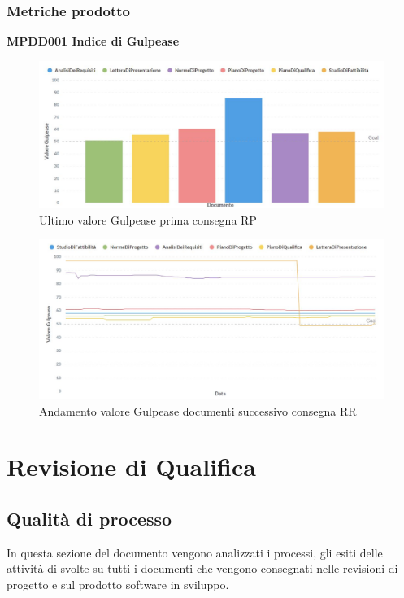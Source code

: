 \documentclass[PianoDiQualifica.tex]{subfiles}
\begin{document}
\subsubsection{Metriche prodotto}
\textbf{MPDD001 Indice di Gulpease}
\begin{figure}[htbp]
	\centering
	\includegraphics[width=1\linewidth]{RP/gulpease}
	\caption{Ultimo valore Gulpease prima consegna RP}
	\label{fig:processi}
\end{figure}
\begin{figure}[htbp]
	\centering
	\includegraphics[width=1\linewidth]{RP/gulpeasegrid}
	\caption{Andamento valore Gulpease documenti successivo consegna RR}
	\label{fig:processi}
\end{figure}

\section{Revisione di Qualifica}

\subsection{Qualità di processo}
In questa sezione del documento vengono analizzati i processi, gli esiti delle attività di  svolte su tutti i documenti che vengono consegnati nelle revisioni di progetto e sul prodotto software in sviluppo.
\end{document}
